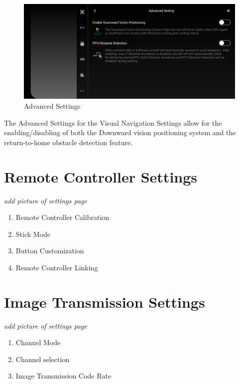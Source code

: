 \documentclass[
]{book}
\providecommand{\tightlist}{%
  \setlength{\itemsep}{0pt}\setlength{\parskip}{0pt}}
\begin{document}
\begin{figure}
\centering
\includegraphics{images/VN/DJI-VN-AdvancedSettings.jpg}
\caption{Advanced Settings}
\end{figure}

The Advanced Settings for the Visual Navigation Settings allow for the enabling/disabling of both the Downward vision positioning system and the return-to-home obstacle detection feature.

\hypertarget{remote-controller-settings}{%
\section{Remote Controller Settings}\label{remote-controller-settings}}

\emph{add picture of settings page}

\begin{enumerate}
\def\labelenumi{\arabic{enumi}.}
\tightlist
\item
  Remote Controller Calibration
\item
  Stick Mode
\item
  Button Customization
\item
  Remote Controller Linking
\end{enumerate}

\hypertarget{image-transmission-settings}{%
\section{Image Transmission Settings}\label{image-transmission-settings}}

\emph{add picture of settings page}

\begin{enumerate}
\def\labelenumi{\arabic{enumi}.}
\tightlist
\item
  Channel Mode
\item
  Channel selection
\item
  Image Transmission Code Rate
\end{enumerate}
\end{document}
